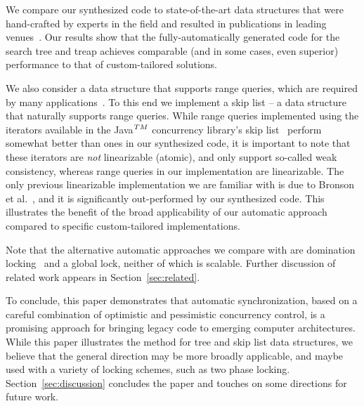 We compare our synthesized code to state-of-the-art data structures 
that were hand-crafted by experts in the field and resulted in publications in 
leading venues~\cite{DrachslerVY2014,BronsonCCO2010}. Our results show that the 
fully-automatically generated code for the search tree and treap
achieves comparable (and in some cases, even superior) performance to that of 
custom-tailored solutions. 

We also consider a data structure that supports range queries, which are required by 
many applications~\cite{levelDB,xxx}. To this end we implement a skip list -- a data structure that naturally supports range queries. 
While range queries implemented using the iterators available in the Java$^{\sc TM}$ concurrency library's skip list~\cite{xxx} perform 
somewhat better than ones in our synthesized code, it is important to note that these iterators are \emph{not}
linearizable (atomic), and only support so-called weak consistency, whereas range queries in our implementation are linearizable.
The only previous linearizable implementation we are familiar with is due to Bronson et al.~\cite{BronsonCCO2010},
and it is significantly out-performed by our synthesized code. This illustrates the benefit of the broad applicability
of our automatic approach compared to specific custom-tailored implementations.

Note that the alternative automatic approaches we compare with are domination locking~\cite{Gueta2011} and a global lock, neither of which is scalable. 
Further discussion of related work appears in Section~\ref{sec:related}. 

To conclude, this paper demonstrates that automatic synchronization, based on a careful combination of optimistic and
pessimistic concurrency control, is a promising approach for bringing legacy code to emerging computer architectures. 
While this paper illustrates the method for tree and skip list data structures, we believe that the general direction may be more broadly applicable, and maybe used with a variety of locking schemes, such as two phase locking. 
Section~\ref{sec:discussion} concludes the paper and touches on some directions for future work. 
